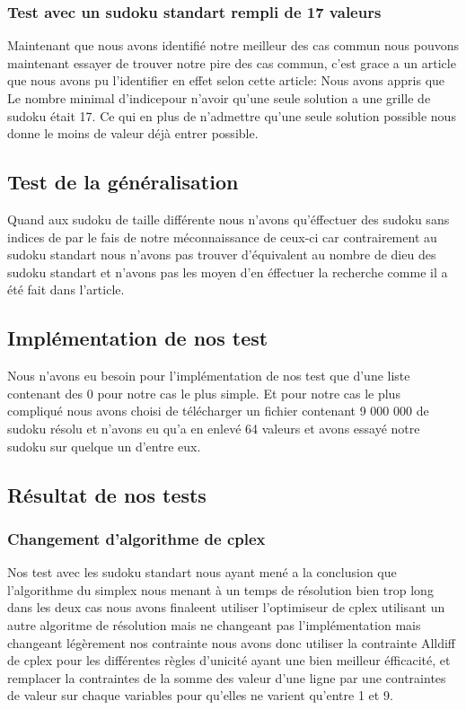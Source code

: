 \subsubsection{Test avec un sudoku standart rempli de 17 valeurs}

Maintenant que nous avons identifié notre meilleur des cas commun nous pouvons maintenant essayer de trouver notre pire des cas commun, c'est grace a un article que nous avons pu l'identifier en effet selon cette article: \cite{NombredeDieu}\newline
Nous avons appris que Le nombre minimal d'indicepour n'avoir qu'une seule solution a une grille de sudoku était 17. Ce qui en plus de n'admettre qu'une seule solution possible nous donne le moins de valeur déjà entrer possible.

\subsection{Test de la généralisation}

Quand aux sudoku de taille différente nous n'avons qu'éffectuer des sudoku sans indices de par le fais de notre méconnaissance de ceux-ci car contrairement au sudoku standart nous n'avons pas trouver d'équivalent au nombre de dieu des sudoku standart et n'avons pas les moyen d'en éffectuer la recherche comme il a été fait dans l'article.

\subsection{Implémentation de nos test}

Nous n'avons eu besoin pour l'implémentation de nos test que d'une liste contenant des 0 pour notre cas le plus simple. Et pour notre cas le plus compliqué nous avons choisi de télécharger un fichier contenant 9 000 000 de sudoku résolu et n'avons eu qu'a en enlevé 64 valeurs et avons essayé notre sudoku sur quelque un d'entre eux.

\subsection{Résultat de nos tests}
\subsubsection{Changement d'algorithme de cplex}
Nos test avec les sudoku standart nous ayant mené a la conclusion que l'algorithme du simplex nous menant à un temps de résolution bien trop long dans les deux cas nous avons finaleent utiliser l'optimiseur de cplex utilisant un autre algoritme de résolution mais ne changeant pas l'implémentation mais changeant légèrement nos contrainte nous avons donc utiliser la contrainte Alldiff de cplex pour les différentes règles d'unicité ayant une bien meilleur éfficacité, et remplacer la contraintes de la somme des valeur d'une ligne par une contraintes de valeur sur chaque variables pour qu'elles ne varient qu'entre 1 et 9.
\newpage

